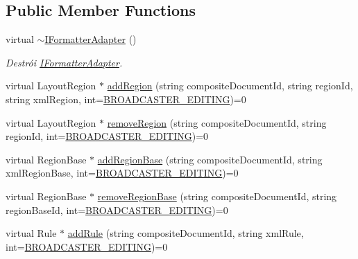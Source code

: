 \subsection*{Public Member Functions}
\begin{DoxyCompactItemize}
\item 
virtual \hyperlink{classbr_1_1ufscar_1_1lince_1_1ginga_1_1wac_1_1editing_1_1IFormatterAdapter_aa2e061e9d4bd5af9ee7abc5354d4f1a7}{$\sim$IFormatterAdapter} ()
\begin{DoxyCompactList}\small\item\em Destrói \hyperlink{classbr_1_1ufscar_1_1lince_1_1ginga_1_1wac_1_1editing_1_1IFormatterAdapter}{IFormatterAdapter}. \item\end{DoxyCompactList}\item 
virtual LayoutRegion $\ast$ \hyperlink{classbr_1_1ufscar_1_1lince_1_1ginga_1_1wac_1_1editing_1_1IFormatterAdapter_a379cbb803df82804f69730a554026081}{addRegion} (string compositeDocumentId, string regionId, string xmlRegion, int=\hyperlink{classbr_1_1ufscar_1_1lince_1_1ginga_1_1wac_1_1editing_1_1IFormatterAdapter_a60586f9a11e5cefcfecef9386c28d4bd}{BROADCASTER\_\-EDITING})=0
\item 
virtual LayoutRegion $\ast$ \hyperlink{classbr_1_1ufscar_1_1lince_1_1ginga_1_1wac_1_1editing_1_1IFormatterAdapter_a7451f3f638fd722aabaacf2674620e13}{removeRegion} (string compositeDocumentId, string regionId, int=\hyperlink{classbr_1_1ufscar_1_1lince_1_1ginga_1_1wac_1_1editing_1_1IFormatterAdapter_a60586f9a11e5cefcfecef9386c28d4bd}{BROADCASTER\_\-EDITING})=0
\item 
virtual RegionBase $\ast$ \hyperlink{classbr_1_1ufscar_1_1lince_1_1ginga_1_1wac_1_1editing_1_1IFormatterAdapter_abef17b93da126eef818bafdbbde2f0ab}{addRegionBase} (string compositeDocumentId, string xmlRegionBase, int=\hyperlink{classbr_1_1ufscar_1_1lince_1_1ginga_1_1wac_1_1editing_1_1IFormatterAdapter_a60586f9a11e5cefcfecef9386c28d4bd}{BROADCASTER\_\-EDITING})=0
\item 
virtual RegionBase $\ast$ \hyperlink{classbr_1_1ufscar_1_1lince_1_1ginga_1_1wac_1_1editing_1_1IFormatterAdapter_a1994d2a14c28cd577919f3988b224f00}{removeRegionBase} (string compositeDocumentId, string regionBaseId, int=\hyperlink{classbr_1_1ufscar_1_1lince_1_1ginga_1_1wac_1_1editing_1_1IFormatterAdapter_a60586f9a11e5cefcfecef9386c28d4bd}{BROADCASTER\_\-EDITING})=0
\item 
virtual Rule $\ast$ \hyperlink{classbr_1_1ufscar_1_1lince_1_1ginga_1_1wac_1_1editing_1_1IFormatterAdapter_aebdea3839c00805a61f5f4229e6d5f6f}{addRule} (string compositeDocumentId, string xmlRule, int=\hyperlink{classbr_1_1ufscar_1_1lince_1_1ginga_1_1wac_1_1editing_1_1IFormatterAdapter_a60586f9a11e5cefcfecef9386c28d4bd}{BROADCASTER\_\-EDITING})=0

\end{DoxyCompactItemize}

